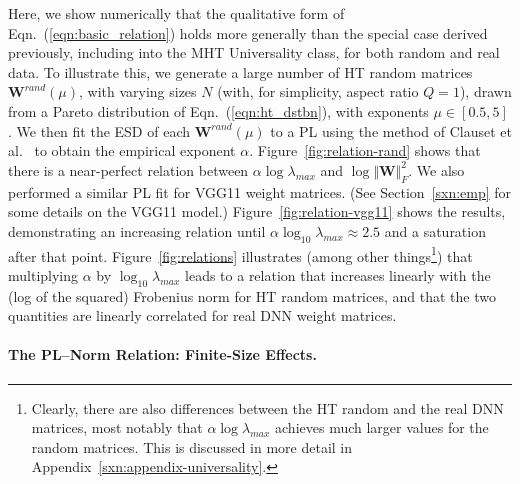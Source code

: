 Here, we show numerically that the qualitative form of Eqn.~(\ref{eqn:basic_relation}) holds more generally than the special case derived previously, including into the MHT Universality class, for both random and real data.
To illustrate this, we generate a large number of HT random matrices $\mathbf{W}^{rand}(\mu)$, with varying sizes $N$ (with, for simplicity, aspect ratio $Q=1$), drawn from a Pareto distribution of Eqn.~(\ref{eqn:ht_dstbn}), with exponents $\mu\in[0.5, 5]$.
We then fit the ESD of each $\mathbf{W}^{rand}(\mu)$ to a PL using the method of Clauset et al.~\cite{CSN09_powerlaw,ABP14} to obtain the empirical exponent $\alpha$.   
Figure~\ref{fig:relation-rand} shows that there is a near-perfect relation between $ \alpha\log\lambda_{max}$ and $\log\Vert\mathbf{W}\Vert^{2}_{F} $.
We also performed a similar PL fit for VGG11 weight matrices.
(See Section~\ref{sxn:emp} for some details on the VGG11 model.)
Figure~\ref{fig:relation-vgg11} shows the results, demonstrating an increasing relation until $ \alpha\log_{10}\lambda_{max} \approx 2.5$ and a saturation after that point.
Figure~\ref{fig:relations} illustrates
(among other things\footnote{Clearly, there are also differences between the HT random and the real DNN matrices, most notably that $ \alpha\log\lambda_{max} $ achieves much larger values for the random matrices.  This is discussed in more detail in Appendix~\ref{sxn:appendix-universality}.})
that multiplying $\alpha$ by $\log_{10}\lambda_{max}$ leads to a relation that increases linearly with the (log of the squared) Frobenius norm for HT random matrices, and that the two quantities are linearly correlated for real DNN weight matrices.



\paragraph{The PL--Norm Relation: Finite-Size Effects.}


